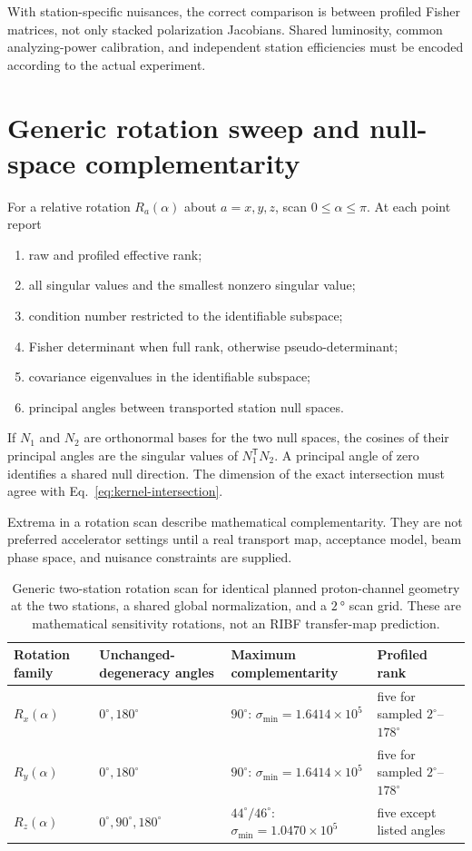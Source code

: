 \documentclass[11pt,a4paper]{article}
\begin{document}
With station-specific nuisances, the correct comparison is between profiled
Fisher matrices, not only stacked polarization Jacobians.  Shared luminosity,
common analyzing-power calibration, and independent station efficiencies must
be encoded according to the actual experiment.

\section{Generic rotation sweep and null-space complementarity}

For a relative rotation $R_a(\alpha)$ about $a=x,y,z$, scan
$0\leq\alpha\leq\pi$.  At each point report
\begin{enumerate}
 \item raw and profiled effective rank;
 \item all singular values and the smallest nonzero singular value;
 \item condition number restricted to the identifiable subspace;
 \item Fisher determinant when full rank, otherwise pseudo-determinant;
 \item covariance eigenvalues in the identifiable subspace;
 \item principal angles between transported station null spaces.
\end{enumerate}
If $N_1$ and $N_2$ are orthonormal bases for the two null spaces, the cosines of
their principal angles are the singular values of $N_1^{\mathsf T}N_2$.  A
principal angle of zero identifies a shared null direction.  The dimension of
the exact intersection must agree with Eq.~\eqref{eq:kernel-intersection}.

Extrema in a rotation scan describe mathematical complementarity.  They are not
preferred accelerator settings until a real transport map, acceptance model,
beam phase space, and nuisance constraints are supplied.

\begin{table}[htbp]
\centering
\caption{Generic two-station rotation scan for identical planned proton-channel
geometry at the two stations, a shared global normalization, and a
$\SI{2}{\degree}$ scan grid.  These are mathematical sensitivity rotations, not
an RIBF transfer-map prediction.}
\small
\begin{tabularx}{\linewidth}{YYYY}
\toprule
Rotation family & Unchanged-degeneracy angles & Maximum complementarity & Profiled rank\\
\midrule
$R_x(\alpha)$ & $0^\circ,180^\circ$ & $90^\circ$: $\sigma_{\min}=1.6414\times10^5$ & five for sampled $2^\circ$--$178^\circ$\\
$R_y(\alpha)$ & $0^\circ,180^\circ$ & $90^\circ$: $\sigma_{\min}=1.6414\times10^5$ & five for sampled $2^\circ$--$178^\circ$\\
$R_z(\alpha)$ & $0^\circ,90^\circ,180^\circ$ & $44^\circ/46^\circ$: $\sigma_{\min}=1.0470\times10^5$ & five except listed angles\\
\bottomrule
\end{tabularx}
\label{tab:rotation-summary}
\end{table}
\end{document}
